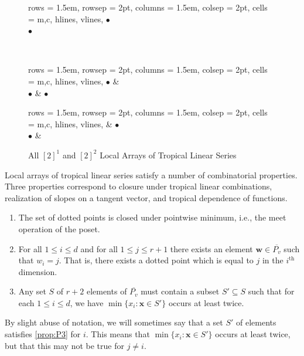 \documentclass{amsart}
\makeatletter
\def\namedlabel#1#2{\begingroup
	#2%
	\def\@currentlabel{#2}%
	\phantomsection\label{#1}\endgroup
}
\makeatother
\begin{document}
	\begin{figure}
		\centering
		\begin{tblr}{
				rows = {1.5em, rowsep = 2pt},
				columns = {1.5em, colsep = 2pt},
				cells = {m,c},
				hlines,
				vlines,
			}
			$\bullet$ \\
			$\bullet$
		\end{tblr} \\
		
		\begin{tblr}{
				rows = {1.5em, rowsep = 2pt},
				columns = {1.5em, colsep = 2pt},
				cells = {m,c},
				hlines,
				vlines,
			}
			$\bullet$ &  \\
			$\bullet$ & $\bullet$ \\
		\end{tblr}
		\begin{tblr}{
				rows = {1.5em, rowsep = 2pt},
				columns = {1.5em, colsep = 2pt},
				cells = {m,c},
				hlines,
				vlines,
			}
			& $\bullet$ \\
			$\bullet$ &  \\
		\end{tblr}
		\caption{All $[2]^1$ and $[2]^2$ Local Arrays of Tropical Linear Series} 
		\label{Fig:rk2-d12-local-arrays}
	\end{figure}
	
	Local arrays of tropical linear series satisfy a number of combinatorial properties. Three properties correspond to closure under tropical linear combinations, realization of slopes on a tangent vector, and tropical dependence of functions.
	
	\begin{enumerate}
		\item [\namedlabel{prop:P1}{(P1)}] The set of dotted points is closed under pointwise minimum, i.e., the meet operation of the poset.
		\item [\namedlabel{prop:P2}{(P2)}] For all $1 \leq i \leq d$ and for all $1 \leq j \leq r+1$ there exists an element $\mathbf{w} \in \overline{P_v}$ such that $w_{i} = j$. That is, there exists a dotted point which is equal to $j$ in the $i^{\text{th}}$ dimension.
		\item [\namedlabel{prop:P3}{(P3)}] Any set $S$ of $r+2$ elements of $\overline{P_v}$ must contain a subset $S' \subseteq S$ such that for each $1 \leq i \leq d$, we have $\min \{ x_i : \mathbf{x} \in S' \}$ occurs at least twice.
	\end{enumerate}
	
	By slight abuse of notation, we will sometimes say that a set $S'$ of elements satisfies \ref{prop:P3} for $i$. This means that $\min \{ x_{i} : \mathbf{x} \in S' \}$ occurs at least twice, but that this may not be true for $j \neq i$.
	
\end{document}
